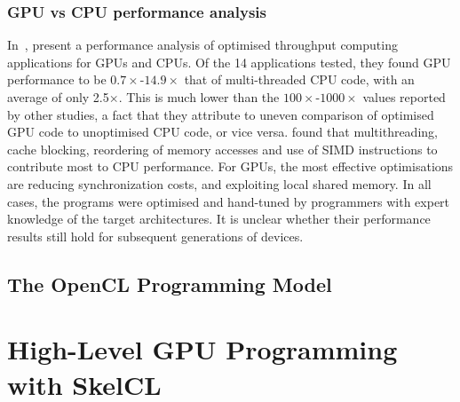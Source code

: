 
\subsubsection{GPU vs CPU performance analysis}

In~\cite{Lee2010}, \citeauthor{Lee2010} present a performance analysis
of optimised throughput computing applications for GPUs and CPUs. Of
the 14 applications tested, they found GPU performance to be
$0.7\times$-$14.9\times$ that of multi-threaded CPU code, with an
average of only 2.5$\times$. This is much lower than the
$100\times$-$1000\times$ values reported by other studies,
a fact that they attribute to uneven comparison of optimised GPU code
to unoptimised CPU code, or vice versa. \citeauthor{Lee2010} found
that multithreading, cache blocking, reordering of memory accesses and
use of SIMD instructions to contribute most to CPU performance. For
GPUs, the most effective optimisations are reducing synchronization
costs, and exploiting local shared memory. In all cases, the programs
were optimised and hand-tuned by programmers with expert knowledge of
the target architectures. It is unclear whether their performance
results still hold for subsequent generations of devices.


\subsection{The OpenCL Programming Model}



\section{High-Level GPU Programming with SkelCL}\label{sec:skelcl-intro}

